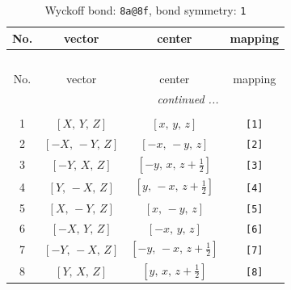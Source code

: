 \documentclass[fleqn,8pt]{jsarticle}
\begin{document}
\begin{longtable}{cccc}
\caption{Wyckoff bond: {\tt 8a@8f}, bond symmetry: {\tt 1}}
 \\
 \hline \hline
No. & vector & center & mapping \\ \hline \endfirsthead

\multicolumn{3}{l}{\tablename\ \thetable{}} \\
 \hline \hline
No. & vector & center & mapping \\ \hline \endhead

 \hline \hline
\multicolumn{3}{r}{\footnotesize\it continued ...} \\ \endfoot

 \hline \hline
\multicolumn{3}{r}{} \\ \endlastfoot

1 & $\left[ X,\, Y,\, Z \right]$ & $\left[ x,\, y,\, z \right]$ & {\tt [1]} \\ \hline
2 & $\left[ - X,\, - Y,\, Z \right]$ & $\left[ - x,\, - y,\, z \right]$ & {\tt [2]} \\ \hline
3 & $\left[ - Y,\, X,\, Z \right]$ & $\left[ - y,\, x,\, z + \frac{1}{2} \right]$ & {\tt [3]} \\ \hline
4 & $\left[ Y,\, - X,\, Z \right]$ & $\left[ y,\, - x,\, z + \frac{1}{2} \right]$ & {\tt [4]} \\ \hline
5 & $\left[ X,\, - Y,\, Z \right]$ & $\left[ x,\, - y,\, z \right]$ & {\tt [5]} \\ \hline
6 & $\left[ - X,\, Y,\, Z \right]$ & $\left[ - x,\, y,\, z \right]$ & {\tt [6]} \\ \hline
7 & $\left[ - Y,\, - X,\, Z \right]$ & $\left[ - y,\, - x,\, z + \frac{1}{2} \right]$ & {\tt [7]} \\ \hline
8 & $\left[ Y,\, X,\, Z \right]$ & $\left[ y,\, x,\, z + \frac{1}{2} \right]$ & {\tt [8]} \\
\end{longtable}
\end{document}
